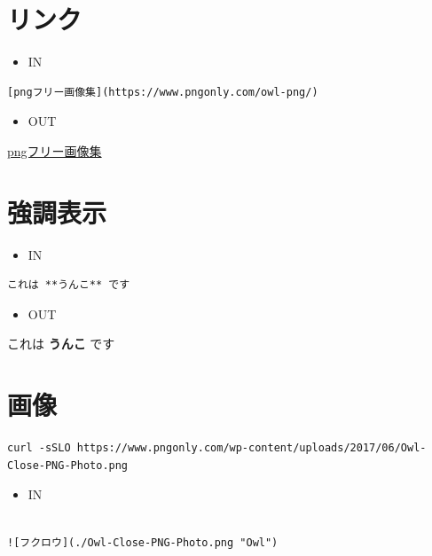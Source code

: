 \documentclass[]{article}
\begin{document}
\section{リンク}\label{header-n322}

\begin{itemize}
\item
  IN
\end{itemize}

\begin{verbatim}
[pngフリー画像集](https://www.pngonly.com/owl-png/)
\end{verbatim}

\begin{itemize}
\item
  OUT
\end{itemize}

\href{https://www.pngonly.com/owl-png/}{pngフリー画像集}

\section{強調表示}\label{header-n331}

\begin{itemize}
\item
  IN
\end{itemize}

\begin{verbatim}
これは **うんこ** です
\end{verbatim}

\begin{itemize}
\item
  OUT
\end{itemize}

これは \textbf{うんこ} です

\section{画像}\label{header-n341}

\begin{verbatim}
curl -sSLO https://www.pngonly.com/wp-content/uploads/2017/06/Owl-Close-PNG-Photo.png
\end{verbatim}

\begin{itemize}
\item
  IN
\end{itemize}

\begin{verbatim}

![フクロウ](./Owl-Close-PNG-Photo.png "Owl")
\end{verbatim}
\end{document}
